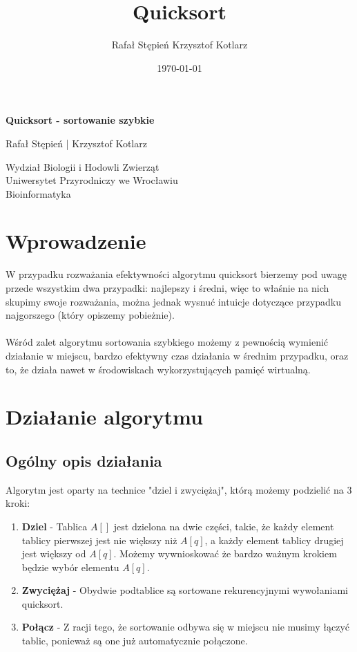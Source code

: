 \documentclass[a4paper,11pt]{report}
\title{Quicksort}
\author{Rafał Stępień Krzysztof Kotlarz}
\date{\today}
\begin{document}
\renewcommand{\tabcolsep}{10mm}

\begin{titlepage}
   \begin{center}
       \vspace*{9cm}
 
       \textbf{\huge{Quicksort - sortowanie szybkie}}
 
       \vspace{1.5cm}
 
       Rafał Stępień | Krzysztof Kotlarz \\
       \vspace{2cm}

 
       Wydział Biologii i Hodowli Zwierząt\\
       Uniwersytet Przyrodniczy we Wrocławiu\\
       Bioinformatyka\\
 
   \end{center}
\end{titlepage}
\newpage
\tableofcontents
\newpage
\chapter{Wprowadzenie}
\hspace{10pt} W przypadku rozważania efektywności algorytmu quicksort bierzemy pod uwagę przede wszystkim dwa przypadki: najlepszy i średni, więc to właśnie na nich skupimy swoje rozważania, można jednak wysnuć intuicje dotyczące przypadku najgorszego (który opiszemy pobieżnie).\\
\\
Wśród zalet algorytmu sortowania szybkiego możemy z pewnością wymienić działanie w miejscu, bardzo efektywny czas działania w średnim przypadku, oraz to, że działa nawet w środowiskach wykorzystujących pamięć wirtualną.
\chapter{Działanie algorytmu}
\section{Ogólny opis działania}
Algorytm jest oparty na technice "dziel i zwyciężaj", którą możemy podzielić na 3 kroki:
\begin{enumerate}
\item \textbf{Dziel} - Tablica $A[]$ jest dzielona na dwie części, takie, że każdy element tablicy pierwszej jest nie większy niż $A[q]$, a każdy element tablicy drugiej jest większy od $A[q]$. Możemy wywnioskować że bardzo ważnym krokiem będzie wybór elementu $A[q]$.
\item \textbf{Zwyciężaj} - Obydwie podtablice są sortowane rekurencyjnymi wywołaniami quicksort.
\item \textbf{Połącz} - Z racji tego, że sortowanie odbywa się w miejscu nie musimy łączyć tablic, ponieważ są one już automatycznie połączone.
\end{enumerate}
\end{document}
